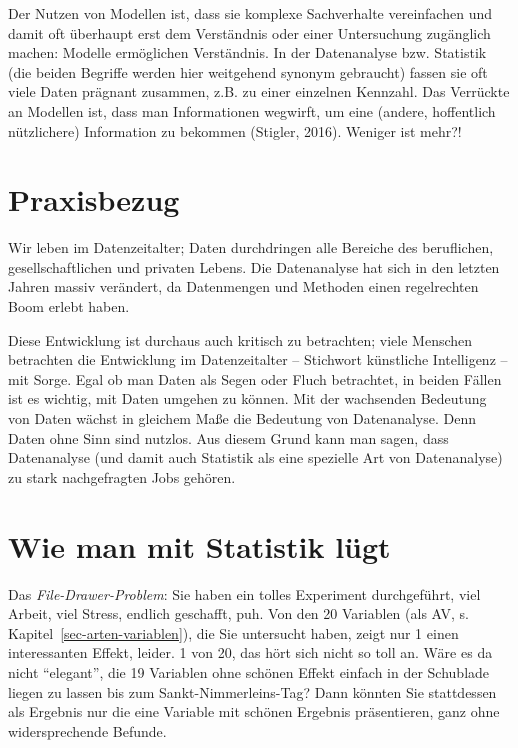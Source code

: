 \documentclass[
  letterpaper,
]{scrbook}
\theoremstyle{definition}
\theoremstyle{definition}
\theoremstyle{definition}
\theoremstyle{remark}
\begin{document}
Der Nutzen von Modellen ist, dass sie komplexe Sachverhalte vereinfachen
und damit oft überhaupt erst dem Verständnis oder einer Untersuchung
zugänglich machen: Modelle ermöglichen Verständnis. In der Datenanalyse
bzw. Statistik (die beiden Begriffe werden hier weitgehend synonym
gebraucht) fassen sie oft viele Daten prägnant zusammen, z.B. zu einer
einzelnen Kennzahl. Das Verrückte an Modellen ist, dass man
Informationen wegwirft, um eine (andere, hoffentlich nützlichere)
Information zu bekommen (Stigler, 2016). Weniger ist mehr?!

\section{Praxisbezug}\label{praxisbezug}

Wir leben im Datenzeitalter; Daten durchdringen alle Bereiche des
beruflichen, gesellschaftlichen und privaten Lebens. Die Datenanalyse
hat sich in den letzten Jahren massiv verändert, da Datenmengen und
Methoden einen regelrechten Boom erlebt haben.

Diese Entwicklung ist durchaus auch kritisch zu betrachten; viele
Menschen betrachten die Entwicklung im Datenzeitalter -- Stichwort
künstliche Intelligenz -- mit Sorge. Egal ob man Daten als Segen oder
Fluch betrachtet, in beiden Fällen ist es wichtig, mit Daten umgehen zu
können. Mit der wachsenden Bedeutung von Daten wächst in gleichem Maße
die Bedeutung von Datenanalyse. Denn Daten ohne Sinn sind nutzlos. Aus
diesem Grund kann man sagen, dass Datenanalyse (und damit auch Statistik
als eine spezielle Art von Datenanalyse) zu stark nachgefragten Jobs
gehören.

\section{Wie man mit Statistik
lügt}\label{wie-man-mit-statistik-luxfcgt}

Das \emph{File-Drawer-Problem}: Sie haben ein tolles Experiment
durchgeführt, viel Arbeit, viel Stress, endlich geschafft, puh. Von den
20 Variablen (als AV, s. Kapitel~\ref{sec-arten-variablen}), die Sie
untersucht haben, zeigt nur 1 einen interessanten Effekt, leider. 1 von
20, das hört sich nicht so toll an. Wäre es da nicht \enquote{elegant},
die 19 Variablen ohne schönen Effekt einfach in der Schublade liegen zu
lassen bis zum Sankt-Nimmerleins-Tag? Dann könnten Sie stattdessen als
Ergebnis nur die eine Variable mit schönen Ergebnis präsentieren, ganz
ohne widersprechende Befunde.
\end{document}
